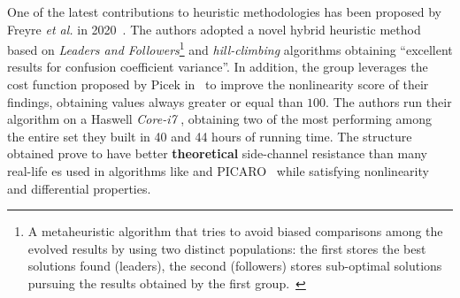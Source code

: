        One of the latest contributions to heuristic methodologies has been proposed by Freyre \emph{et al.} in 2020~\cite{freyre2020evolving}. The authors adopted a novel hybrid heuristic method based on \emph{Leaders and Followers}\footnote{A metaheuristic algorithm that tries to avoid biased comparisons among the evolved results by using two distinct populations: the first stores the best solutions found (leaders), the second (followers) stores sub-optimal solutions pursuing the results obtained by the first group.~\cite{freyre2020evolving}} and \emph{hill-climbing} algorithms obtaining ``excellent results for confusion coefficient variance''. In addition, the group leverages the cost function proposed by Picek in~\cite{picek2016new} to improve the nonlinearity score of their findings, obtaining values always greater or equal than $100$. The authors run their algorithm on a Haswell \emph{Core\tm-i7} , obtaining two of the most performing \sbocs{} among the entire set they built in 40 and 44 hours of running time. The structure obtained prove to have better \textbf{theoretical} side-channel resistance than many real-life \sbocs{}es used in algorithms like \aes{} and PICARO~\cite{piret2012picaro} while satisfying nonlinearity and differential properties.





    